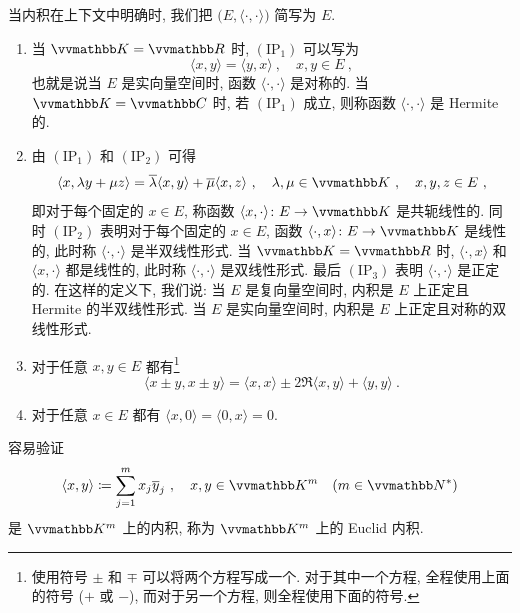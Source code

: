 当内积在上下文中明确时, 我们把 \(\bigl(E, \langle \cdot, \cdot \rangle\bigr)\) 简写为 \(E\).

\begin{remark}\label{rem:inner-product-property}
    \begin{enumerate}
        \item 当 \(\K = \R\) 时, \hyperref[ax:inner-product]{\((\mathrm{IP}_1)\)} 可以写为
        \[
            \langle x, y \rangle = \langle y, x \rangle\ ,\quad x, y \in E\ ,
        \]
        也就是说当 \(E\) 是实向量空间时, 函数 \(\langle \cdot, \cdot \rangle\) 是对称的. 当 \(\K = \C\) 时, 若 \hyperref[ax:inner-product]{\((\mathrm{IP}_1)\)} 成立, 则称函数 \(\langle \cdot, \cdot \rangle\) 是 Hermite 的.
        \item 由 \hyperref[ax:inner-product]{\((\mathrm{IP}_1)\)} 和 \hyperref[ax:inner-product]{\((\mathrm{IP}_2)\)} 可得
        \[
            \langle x, \lambda y + \mu z \rangle = \overline \lambda \langle x, y \rangle + \overline \mu \langle x, z \rangle\ ,\quad \lambda, \mu \in \K\ ,\quad x, y, z \in E\ ,
        \]
        即对于每个固定的 \(x \in E\), 称函数 \(\langle x, \cdot \rangle \colon E \to \K\) 是共轭线性的. 同时 \hyperref[ax:inner-product]{\((\mathrm{IP}_2)\)} 表明对于每个固定的 \(x \in E\), 函数 \(\langle \cdot, x \rangle \colon E \to \K\) 是线性的, 此时称 \(\langle \cdot, \cdot \rangle\) 是半双线性形式. 当 \(\K = \R\) 时, \(\langle \cdot, x \rangle\) 和 \(\langle x, \cdot \rangle\) 都是线性的, 此时称 \(\langle \cdot, \cdot \rangle\) 是双线性形式. 最后 \hyperref[ax:inner-product]{\((\mathrm{IP}_3)\)} 表明 \(\langle \cdot, \cdot \rangle\) 是正定的. 在这样的定义下, 我们说: 当 \(E\) 是复向量空间时, 内积是 \(E\) 上正定且 Hermite 的半双线性形式. 当 \(E\) 是实向量空间时, 内积是 \(E\) 上正定且对称的双线性形式.
        \item 对于任意 \(x, y \in E\) 都有\footnote{使用符号 \(\pm\) 和 \(\mp\) 可以将两个方程写成一个. 对于其中一个方程, 全程使用上面的符号 (\(+\) 或 \(-\)), 而对于另一个方程, 则全程使用下面的符号.}
        \[
            \langle x \pm y, x \pm y \rangle = \langle x, x \rangle \pm 2 \Re \langle x, y \rangle + \langle y, y \rangle\ .
        \]
        \item 对于任意 \(x \in E\) 都有 \(\langle x, 0 \rangle = \langle 0, x \rangle = 0\).
    \end{enumerate}
\end{remark}

容易验证
\[
    \langle x, y \rangle \coloneqq \sum_{j = 1}^m x_j \overline y_j\ ,\quad x, y \in \K^m\quad (m \in \N^\ast)
\]
是 \(\K^m\) 上的内积, 称为 \(\K^m\) 上的 Euclid 内积.

